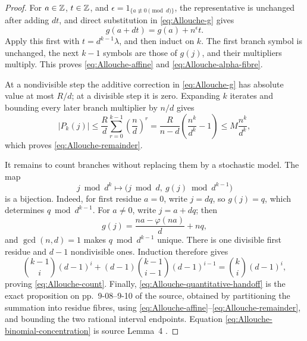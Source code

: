 \begin{proof}
For \(a\in\mathbb{Z}\), \(t\in\mathbb{Z}\), and
\(\epsilon=1_{\{a\not\equiv0\pmod d\}}\), the representative is unchanged
after adding \(dt\), and direct substitution in \eqref{eq:Allouche-g}
gives
\begin{equation}
\label{eq:Allouche-triangular-step}
 g(a+dt)=g(a)+n^\epsilon t.
\end{equation}
Apply this first with \(t=d^{k-1}\lambda\), and then induct on \(k\).
The first branch symbol is unchanged, the next \(k-1\) symbols are those of
\(g(j)\), and their multipliers multiply.  This proves
\eqref{eq:Allouche-affine} and \eqref{eq:Allouche-alpha-fibre}.

At a nondivisible step the additive correction in
\eqref{eq:Allouche-g} has absolute value at most \(R/d\); at a divisible
step it is zero.  Expanding \(k\) iterates and bounding every later branch
multiplier by \(n/d\) gives
\[
 |P_k(j)|
 \le\frac Rd\sum_{r=0}^{k-1}\left(\frac nd\right)^r
 =\frac{R}{n-d}\left(\frac{n^k}{d^k}-1\right)
 \le M\frac{n^k}{d^k},
\]
which proves \eqref{eq:Allouche-remainder}.

It remains to count branches without replacing them by a stochastic model.
The map
\[
 j\bmod d^k
 \longmapsto
 \bigl(j\bmod d,\ g(j)\bmod d^{k-1}\bigr)
\]
is a bijection.  Indeed, for first residue \(a=0\), write \(j=dq\), so
\(g(j)=q\), which determines \(q\bmod d^{k-1}\).  For \(a\ne0\), write
\(j=a+dq\); then
\[
 g(j)=\frac{na-\varphi(na)}d+nq,
\]
and \(\gcd(n,d)=1\) makes \(q\bmod d^{k-1}\) unique.  There is one divisible
first residue and \(d-1\) nondivisible ones.  Induction therefore gives
\[
 \binom{k-1}{i}(d-1)^i+
 (d-1)\binom{k-1}{i-1}(d-1)^{i-1}
 =\binom{k}{i}(d-1)^i,
\]
proving \eqref{eq:Allouche-count}.  Finally,
\eqref{eq:Allouche-quantitative-handoff} is the exact proposition on
pp.~9-08--9-10 of the source, obtained by partitioning the summation into
residue fibres, using \eqref{eq:Allouche-affine}--\eqref{eq:Allouche-remainder},
and bounding the two rational interval endpoints.  Equation
\eqref{eq:Allouche-binomial-concentration} is source Lemma~4
\cite[pp.~9-04--9-11]{Allouche1979}.
\end{proof}

